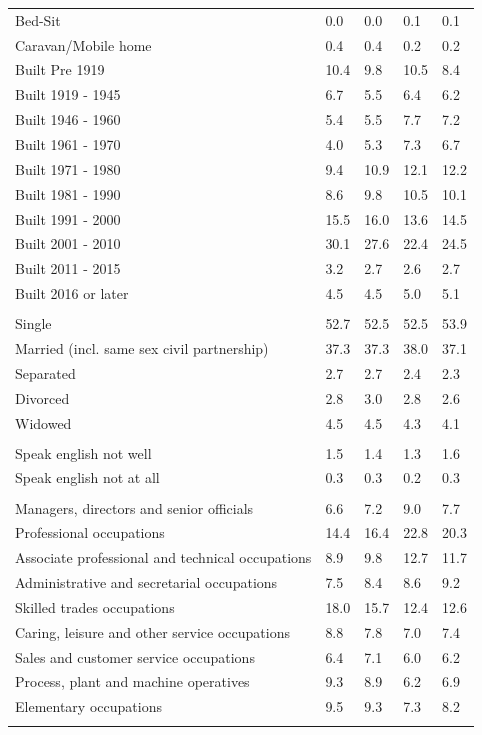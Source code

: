 \documentclass{article}
\begin{document}
\begin{table}[h]
\begin{tabular}{KTTTT}
Bed-Sit & 0.0& 0.0& 0.1& 0.1\\
Caravan/Mobile home & 0.4& 0.4& 0.2& 0.2\\
    \hline
Built Pre 1919 & 10.4&  9.8& 10.5&  8.4\\
Built 1919 - 1945 & 6.7& 5.5& 6.4& 6.2\\
Built  1946 - 1960 & 5.4& 5.5& 7.7& 7.2\\
Built  1961 - 1970 & 4.0& 5.3& 7.3& 6.7\\
Built  1971 - 1980 &  9.4& 10.9& 12.1& 12.2\\
Built  1981 - 1990 &  8.6&  9.8& 10.5& 10.1\\
Built  1991 - 2000 & 15.5& 16.0& 13.6& 14.5\\
Built  2001 - 2010 & 30.1& 27.6& 22.4& 24.5\\
Built  2011 - 2015 & 3.2& 2.7& 2.6& 2.7\\
Built  2016 or later & 4.5& 4.5& 5.0& 5.1\\
\hline
    \\
    \hline
Single & 52.7& 52.5& 52.5& 53.9\\
Married (incl. same sex civil partnership) & 37.3& 37.3& 38.0& 37.1\\
Separated  & 2.7& 2.7& 2.4& 2.3\\
Divorced  & 2.8& 3.0& 2.8& 2.6\\
Widowed & 4.5& 4.5& 4.3& 4.1\\
\hline
    \\ 
    \hline
Speak english not well & 1.5& 1.4& 1.3& 1.6\\
Speak english not at all & 0.3& 0.3& 0.2& 0.3\\
\hline
    \\
    \hline
Managers, directors and senior officials & 6.6& 7.2& 9.0& 7.7\\
Professional occupations & 14.4& 16.4& 22.8& 20.3\\
Associate professional and technical occupations &  8.9&  9.8& 12.7& 11.7\\
Administrative and secretarial occupations & 7.5& 8.4& 8.6& 9.2\\
Skilled trades occupations & 18.0& 15.7& 12.4& 12.6\\
Caring, leisure and other service occupations & 8.8& 7.8& 7.0& 7.4\\
Sales and customer service occupations & 6.4& 7.1& 6.0& 6.2\\
Process, plant and machine operatives & 9.3& 8.9& 6.2& 6.9\\
Elementary occupations & 9.5& 9.3& 7.3& 8.2\\
\hline
\end{tabular}
\end{table}
\end{document}
